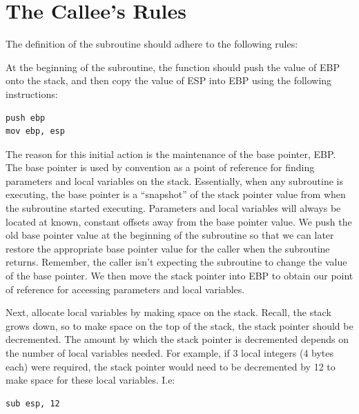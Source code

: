 \section{The Callee's Rules}

The definition of the subroutine should adhere to the following rules:

\begin{numlist}

\item At the beginning of the subroutine, the function should push the
  value of EBP onto the stack, and then copy the value of ESP into EBP
  using the following instructions:

\begin{lstlisting}[backgroundcolor=\color{white},frame=trBL,linewidth=3.75in,xleftmargin=2.25in,label={x86-callee-code-1.lst},language={[x86masm]Assembler},caption={x86 callee code, part 1}]
push ebp
mov ebp, esp
\end{lstlisting}

The reason for this initial action is the maintenance of the base
pointer, EBP. The base pointer is used by convention as a point of
reference for finding parameters and local variables on the stack.
Essentially, when any subroutine is executing, the base pointer is a
``snapshot'' of the stack pointer value from when the subroutine
started executing. Parameters and local variables will always be
located at known, constant offsets away from the base pointer value.
We push the old base pointer value at the beginning of the subroutine
so that we can later restore the appropriate base pointer value for
the caller when the subroutine returns. Remember, the caller isn't
expecting the subroutine to change the value of the base pointer. We
then move the stack pointer into EBP to obtain our point of reference
for accessing parameters and local variables.

\item Next, allocate local variables by making space on the stack.
  Recall, the stack grows down, so to make space on the top of the
  stack, the stack pointer should be decremented. The amount by which
  the stack pointer is decremented depends on the number of local
  variables needed. For example, if 3 local integers (4 bytes each)
  were required, the stack pointer would need to be decremented by 12
  to make space for these local variables. I.e:

\begin{lstlisting}[backgroundcolor=\color{white},frame=trBL,linewidth=3.75in,xleftmargin=2.25in,label={x86-callee-code-2.lst},language={[x86masm]Assembler},caption={x86 callee code, part 2}]
sub esp, 12
\end{lstlisting}


\end{numlist}

